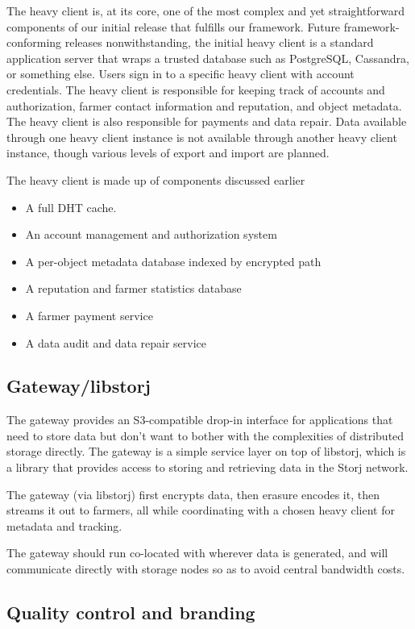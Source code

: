 \documentclass[a4paper,10pt]{article} \usepackage[utf8]{inputenc}
\begin{document}
The heavy client is, at its core, one of the most complex and yet
straightforward components of our initial release that fulfills our framework.
Future framework-conforming releases nonwithstanding, the initial heavy client
is a standard application server that wraps a trusted database such as
PostgreSQL, Cassandra, or something else. Users sign in to a specific heavy
client with account credentials. The heavy client is responsible for
keeping track of accounts and authorization, farmer contact information and
reputation, and object metadata. The heavy client is also responsible for
payments and data repair. Data available through one heavy client instance is
not available through another heavy client instance, though various levels of
export and import are planned.

The heavy client is made up of components discussed earlier

\begin{itemize}
\item A full DHT cache.
\item An account management and authorization system
\item A per-object metadata database indexed by encrypted path
\item A reputation and farmer statistics database
\item A farmer payment service
\item A data audit and data repair service
\end{itemize}

\subsection{Gateway/libstorj}

The gateway provides an S3-compatible drop-in interface for applications that
need to store data but don't want to bother with the complexities of distributed
storage directly. The gateway is a simple service layer on top of libstorj,
which is a library that provides access to storing and retrieving data in the
Storj network.

The gateway (via libstorj) first encrypts data, then erasure encodes it, then
streams it out to farmers, all while coordinating with a chosen heavy client
for metadata and tracking.

The gateway should run co-located with wherever data is generated, and will
communicate directly with storage nodes so as to avoid central bandwidth costs.

\subsection{Quality control and branding}
\end{document}
